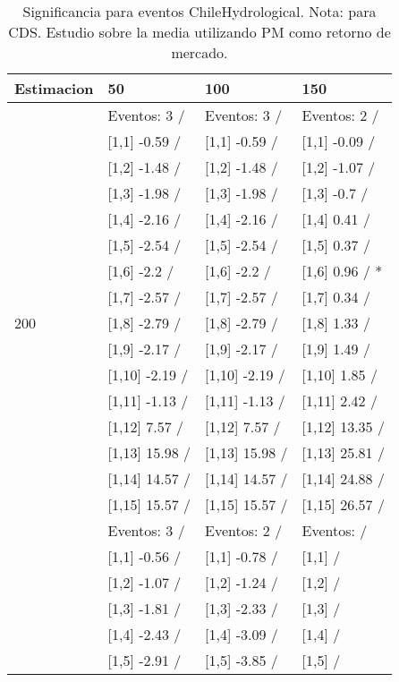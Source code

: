 \begin{table}

\caption{Significancia para eventos ChileHydrological. Nota: para CDS. Estudio sobre la media utilizando PM como retorno de mercado.}
\centering
\begin{tabular}[t]{llll}
\toprule
Estimacion & 50 & 100 & 150\\
\midrule
 & Eventos:  3 / & Eventos:  3 / & Eventos:  2 /\\
 & {}[1,1] -0.59  / & {}[1,1] -0.59  / & {}[1,1] -0.09  /\\
 & {}[1,2] -1.48  / & {}[1,2] -1.48  / & {}[1,2] -1.07  /\\
 & {}[1,3] -1.98  / & {}[1,3] -1.98  / & {}[1,3] -0.7  /\\
 & {}[1,4] -2.16  / & {}[1,4] -2.16  / & {}[1,4] 0.41  /\\
\addlinespace
 & {}[1,5] -2.54  / & {}[1,5] -2.54  / & {}[1,5] 0.37  /\\
 & {}[1,6] -2.2  / & {}[1,6] -2.2  / & {}[1,6] 0.96  / *\\
 & {}[1,7] -2.57  / & {}[1,7] -2.57  / & {}[1,7] 0.34  /\\
200 & {}[1,8] -2.79  / & {}[1,8] -2.79  / & {}[1,8] 1.33  /\\
 & {}[1,9] -2.17  / & {}[1,9] -2.17  / & {}[1,9] 1.49  /\\
\addlinespace
 & {}[1,10] -2.19  / & {}[1,10] -2.19  / & {}[1,10] 1.85  /\\
 & {}[1,11] -1.13  / & {}[1,11] -1.13  / & {}[1,11] 2.42  /\\
 & {}[1,12] 7.57  / & {}[1,12] 7.57  / & {}[1,12] 13.35  /\\
 & {}[1,13] 15.98  / & {}[1,13] 15.98  / & {}[1,13] 25.81  /\\
 & {}[1,14] 14.57  / & {}[1,14] 14.57  / & {}[1,14] 24.88  /\\
\addlinespace
 & {}[1,15] 15.57  / & {}[1,15] 15.57  / & {}[1,15] 26.57  /\\
 & Eventos:  3 / & Eventos:  2 / & Eventos:   /\\
 & {}[1,1] -0.56  / & {}[1,1] -0.78  / & {}[1,1]  /\\
 & {}[1,2] -1.07  / & {}[1,2] -1.24  / & {}[1,2]  /\\
 & {}[1,3] -1.81  / & {}[1,3] -2.33  / & {}[1,3]  /\\
\addlinespace
 & {}[1,4] -2.43  / & {}[1,4] -3.09  / & {}[1,4]  /\\
 & {}[1,5] -2.91  / & {}[1,5] -3.85  / & {}[1,5]  /\\

\end{tabular}
\end{table}
